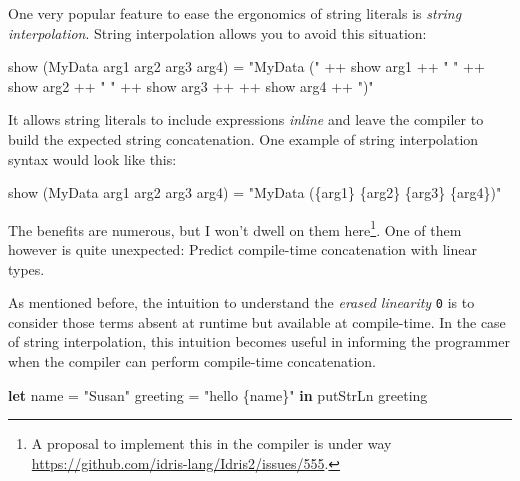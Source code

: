 \documentclass[
]{article}
\newenvironment{Shaded}{}{}
\newcommand{\DataTypeTok}[1]{\textcolor[rgb]{0.56,0.13,0.00}{#1}}
\newcommand{\FunctionTok}[1]{\textcolor[rgb]{0.02,0.16,0.49}{#1}}
\newcommand{\KeywordTok}[1]{\textcolor[rgb]{0.00,0.44,0.13}{\textbf{#1}}}
\newcommand{\NormalTok}[1]{#1}
\newcommand{\OperatorTok}[1]{\textcolor[rgb]{0.40,0.40,0.40}{#1}}
\newcommand{\OtherTok}[1]{\textcolor[rgb]{0.00,0.44,0.13}{#1}}
\newcommand{\StringTok}[1]{\textcolor[rgb]{0.25,0.44,0.63}{#1}}
\begin{document}
One very popular feature to ease the ergonomics of string literals is
\emph{string interpolation}. String interpolation allows you to avoid
this situation:

\begin{Shaded}
\begin{Highlighting}[]
\FunctionTok{show}\NormalTok{ (}\DataTypeTok{MyData}\NormalTok{ arg1 arg2 arg3 arg4) }\OtherTok{=} 
    \StringTok{"MyData ("} \OperatorTok{++} \FunctionTok{show}\NormalTok{ arg1 }\OperatorTok{++} \StringTok{" "} \OperatorTok{++} \FunctionTok{show}\NormalTok{ arg2 }\OperatorTok{++} \StringTok{" "} \OperatorTok{++} \FunctionTok{show}\NormalTok{ arg3 }\OperatorTok{++} \OperatorTok{++} \FunctionTok{show}\NormalTok{ arg4 }\OperatorTok{++} \StringTok{")"}
\end{Highlighting}
\end{Shaded}

It allows string literals to include expressions \emph{inline} and leave
the compiler to build the expected string concatenation. One example of
string interpolation syntax would look like this:

\begin{Shaded}
\begin{Highlighting}[]
\FunctionTok{show}\NormalTok{ (}\DataTypeTok{MyData}\NormalTok{ arg1 arg2 arg3 arg4) }\OtherTok{=} \StringTok{"MyData (\{arg1\} \{arg2\} \{arg3\} \{arg4\})"}
\end{Highlighting}
\end{Shaded}

The benefits are numerous, but I won't dwell on them here\footnote{A
  proposal to implement this in the compiler is under way
  \url{https://github.com/idris-lang/Idris2/issues/555}.}. One of them
however is quite unexpected: Predict compile-time concatenation with
linear types.

As mentioned before, the intuition to understand the \emph{erased
linearity} \texttt{0} is to consider those terms absent at runtime but
available at compile-time. In the case of string interpolation, this
intuition becomes useful in informing the programmer when the compiler
can perform compile-time concatenation.

\begin{Shaded}
\begin{Highlighting}[]
\KeywordTok{let}\NormalTok{ name }\OtherTok{=} \StringTok{"Susan"}
\NormalTok{    greeting }\OtherTok{=} \StringTok{"hello \{name\}"} \KeywordTok{in}
    \FunctionTok{putStrLn}\NormalTok{ greeting}
\end{Highlighting}
\end{Shaded}
\end{document}
